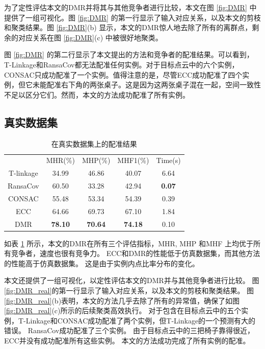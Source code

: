为了定性评估本文的DMR并将其与其他竞争者进行比较，本文在图 \ref{fig:DMR} 中提供了一组可视化。图 \ref{fig:DMR} 的第一行显示了输入对应关系，以及本文的剪枝和聚类结果。图 \ref{fig:DMR}(b) 显示，本文的DMR惊人地去除了所有的离群点，剩余的对应关系在图 \ref{fig:DMR}(c) 中被很好地聚类。

图 \ref{fig:DMR} 的第二行显示了本文提出的方法和竞争者的配准结果。可以看到，T-Linkage和RansaCov都无法配准任何实例。对于目标点云中的六个实例，CONSAC只成功配准了一个实例。值得注意的是，尽管ECC成功配准了四个实例，但它未能配准右下角的两张桌子。这是因为这两张桌子混在一起，空间一致性不足以区分它们。然而，本文的方法成功配准了所有实例。

\subsection{真实数据集}
\begin{table}[ht]
        \centering
        \caption{在真实数据集上的配准结果}
        \begin{tabular}{ccccc}
        \hline\noalign{\smallskip}
        & MHR(\%)         & MHP(\%)         & MHF1(\%)         & Time(s)       \\
        \noalign{\smallskip}
        \hline
        \noalign{\smallskip}
        T-linkage  & 34.99          & 46.86          & 40.07          & 6.64          \\
        RansaCov   & 60.50          & 33.28          & 42.94          & \textbf{0.07} \\
        CONSAC     & 55.48          & 53.34          & 54.39          & 0.39          \\
        ECC        & 64.66          & 69.73          & 67.10          & 1.84          \\
        DMR   & \textbf{78.10} & \textbf{70.64} & \textbf{74.18} & 0.10        \\ 
        \hline
        \end{tabular}
        \label{tab:DMR_real}
\end{table}
      
如表 \ref{tab:DMR_real} 所示，本文的DMR在所有三个评估指标，MHR, MHP 和MHF 上均优于所有竞争者，速度也很有竞争力。 
ECC和DMR的性能低于仿真数据集，而其他方法的性能高于仿真数据集。 
这是由于实例内点比率分布的变化。 
      
本文还提供了一组可视化，以定性评估本文的DMR并与其他竞争者进行比较。 
图 \ref{fig:DMR_real}的第一行显示了输入对应关系，以及本文的剪枝和聚类结果。 
图 \ref{fig:DMR_real}(b)表明，本文的方法几乎去除了所有的异常值，确保了如图 \ref{fig:DMR_real}(c)所示的后续聚类高效执行。 
对于包含在目标点云中的五个实例，T-Linkage和CONSAC成功配准了两个实例，但T-Linkage的一个预测有大的错误。 
RansaCov成功配准了三个实例。 
由于目标点云中的三把椅子靠得很近，ECC并没有成功配准所有这些实例。 
本文的方法成功完成了所有实例的配准。
      
